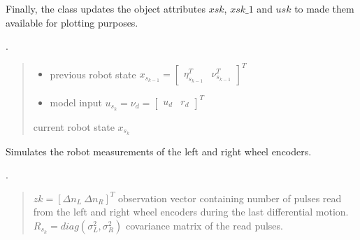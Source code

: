 \documentclass[letterpaper,10pt,english]{sphinxmanual}
\begin{document}
\begin{fulllineitems}
\begin{fulllineitems}
\sphinxAtStartPar
Finally, the class updates the object attributes \(xsk\), \(xsk\_1\) and  \(usk\) to made them available for plotting purposes.

\sphinxAtStartPar
{}.
\begin{quote}\begin{description}
\begin{itemize}
\item {} 
\sphinxAtStartPar
{} \textendash{} previous robot state \(x_{s_{k-1}}=\begin{bmatrix}\eta_{s_{k-1}}^T & \nu_{s_{k-1}}^T\end{bmatrix}^T\)

\item {} 
\sphinxAtStartPar
{} \textendash{} model input \(u_{s_k}=\nu_{d}=\begin{bmatrix} u_d& r_d\end{bmatrix}^T\)

\end{itemize}

\sphinxAtStartPar
current robot state \(x_{s_k}\)

\end{description}\end{quote}

\end{fulllineitems}


\begin{fulllineitems}
\label{\detokenize{robot_simulation:DifferentialDriveSimulatedRobot.DifferentialDriveSimulatedRobot.ReadEncoders}}
\pysigstartsignatures
{}
\pysigstopsignatures
\sphinxAtStartPar
Simulates the robot measurements of the left and right wheel encoders.

\sphinxAtStartPar
{}.
\begin{quote}\begin{description}
\sphinxAtStartPar
\(zk=[\Delta n_L~ \Delta n_R]^T\) observation vector containing number of pulses read from the left and right wheel encoders during the last differential motion. \(R_{s_k}=diag(\sigma_L^2,\sigma_R^2)\) covariance matrix of the read pulses.


\end{description}
\end{quote}
\end{fulllineitems}
\end{fulllineitems}
\end{document}
